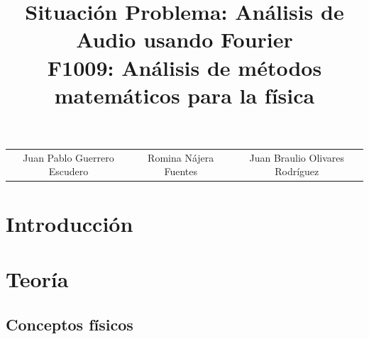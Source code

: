 \documentclass[12pt, letterpaper]{article}
\title{%
  Situación Problema: Análisis de Audio usando Fourier \\
  \large F1009: Análisis de métodos matemáticos para la física}
\begin{document}
\maketitle

\begin{tabular}{ccc}
Juan Pablo Guerrero Escudero & Romina Nájera Fuentes & Juan Braulio Olivares Rodríguez
\end{tabular}

\section{Introducción}

\section{Teoría}

\subsection{Conceptos físicos}
\end{document}
